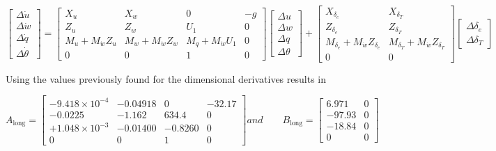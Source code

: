 \documentclass[11pt]{article}
\begin{document}
\begin{equation}\label{eq:equation_51}
\begin{bmatrix} \Delta\dot u \\ \Delta\dot w \\ \Delta\dot q \\ \Delta\dot\theta \end{bmatrix}
=
\begin{bmatrix}
X_u                          & X_w                          & 0                          & -g \\
Z_u                          & Z_w                          & U_1                        & 0 \\
M_u + M_{\dot w} Z_u         & M_w + M_{\dot w} Z_w         & M_q + M_{\dot w} U_1       & 0 \\
0                            & 0                            & 1                          & 0
\end{bmatrix}
\begin{bmatrix} \Delta u \\ \Delta w \\ \Delta q \\ \Delta\theta \end{bmatrix}
+
\begin{bmatrix}
X_{\delta_e}                  & X_{\delta_T} \\
Z_{\delta_e}                  & Z_{\delta_T} \\
M_{\delta_e} + M_{\dot w} Z_{\delta_e} & M_{\delta_T} + M_{\dot w} Z_{\delta_T} \\
0                             & 0
\end{bmatrix}
\begin{bmatrix} \Delta\delta_e \\ \Delta\delta_T \end{bmatrix}
\end{equation}

Using the values previously found for the dimensional derivatives results in

\begin{equation}\label{eq:equation_52}
A_\text{long} =
\begin{bmatrix}
-9.418\!\times\!10^{-4} & -0.04918 & 0       & -32.17 \\
-0.0225                 & -1.162   & 634.4   & 0      \\
+1.048\!\times\!10^{-3} & -0.01400 & -0.8260 & 0      \\
0                       & 0        & 1       & 0
\end{bmatrix} and
\qquad
B_\text{long} =
\begin{bmatrix}
6.971  & 0 \\
-97.93 & 0 \\
-18.84 & 0 \\
0      & 0
\end{bmatrix}
\end{equation}
\end{document}
